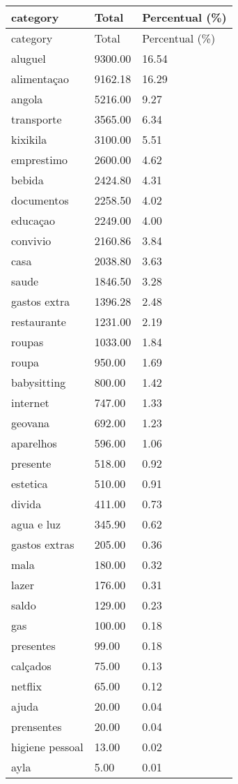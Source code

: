 \documentclass[
  8pt,
  a4paper,
  DIV=11,
  numbers=noendperiod]{scrartcl}
\begin{document}
\begin{figure}
\begin{minipage}{0.50\linewidth}
\begin{longtable}[]{@{}lll@{}}
\caption{}\label{T_976b2}\tabularnewline
\toprule\noalign{}
category & Total & Percentual (\%) \\
\midrule\noalign{}
\endfirsthead
\toprule\noalign{}
category & Total & Percentual (\%) \\
\midrule\noalign{}
\endhead
\bottomrule\noalign{}
\endlastfoot
aluguel & 9300.00 & 16.54 \\
alimentaçao & 9162.18 & 16.29 \\
angola & 5216.00 & 9.27 \\
transporte & 3565.00 & 6.34 \\
kixikila & 3100.00 & 5.51 \\
emprestimo & 2600.00 & 4.62 \\
bebida & 2424.80 & 4.31 \\
documentos & 2258.50 & 4.02 \\
educaçao & 2249.00 & 4.00 \\
convivio & 2160.86 & 3.84 \\
casa & 2038.80 & 3.63 \\
saude & 1846.50 & 3.28 \\
gastos extra & 1396.28 & 2.48 \\
restaurante & 1231.00 & 2.19 \\
roupas & 1033.00 & 1.84 \\
roupa & 950.00 & 1.69 \\
babysitting & 800.00 & 1.42 \\
internet & 747.00 & 1.33 \\
geovana & 692.00 & 1.23 \\
aparelhos & 596.00 & 1.06 \\
presente & 518.00 & 0.92 \\
estetica & 510.00 & 0.91 \\
divida & 411.00 & 0.73 \\
agua e luz & 345.90 & 0.62 \\
gastos extras & 205.00 & 0.36 \\
mala & 180.00 & 0.32 \\
lazer & 176.00 & 0.31 \\
saldo & 129.00 & 0.23 \\
gas & 100.00 & 0.18 \\
presentes & 99.00 & 0.18 \\
calçados & 75.00 & 0.13 \\
netflix & 65.00 & 0.12 \\
ajuda & 20.00 & 0.04 \\
prensentes & 20.00 & 0.04 \\
higiene pessoal & 13.00 & 0.02 \\
ayla & 5.00 & 0.01 \\
\end{longtable}


\end{minipage}
\end{figure}
\end{document}
